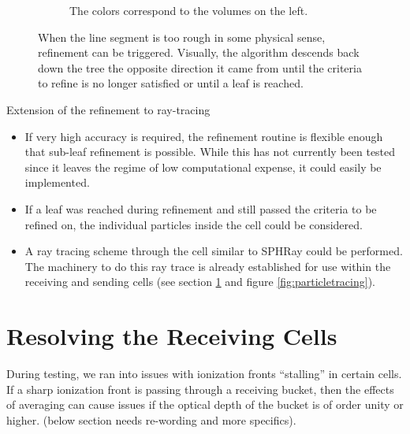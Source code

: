 \begin{figure}
\begin{subfigure}[b]{0.45\textwidth}
                \caption{The colors correspond to the volumes on the left.}
                \label{fig:refinememory}
        \end{subfigure}
        \caption[Refinement during the absorption algorithm.]{When the line segment is too rough in some physical sense, refinement can be triggered. Visually, the algorithm descends back down the tree the opposite direction it came from until the criteria to refine is no longer satisfied or until a leaf is reached.}\label{fig:refining}
\end{figure}



Extension of the refinement to ray-tracing
\begin{itemize}
\item If very high accuracy is required, the refinement routine is flexible enough that sub-leaf refinement is possible. While this has not currently been tested since it leaves the regime of low computational expense, it could easily be implemented.
\item If a leaf was reached during refinement and still passed the criteria to be refined on, the individual particles inside the cell could be considered.
\item A ray tracing scheme through the cell similar to SPHRay \citep{altayEt08} could be performed. The machinery to do this ray trace is already established for use within the receiving and sending cells (see section \ref{sec:resolvingleaves} and figure \ref{fig:particletracing}).
\end{itemize}

\section{Resolving the Receiving Cells}
\label{sec:resolvingleaves}

During testing, we ran into issues with ionization fronts ``stalling'' in certain cells. If a sharp ionization front is passing through a receiving bucket, then the effects of averaging can cause issues if the optical depth of the bucket is of order unity or higher. (below section needs re-wording and more specifics).

